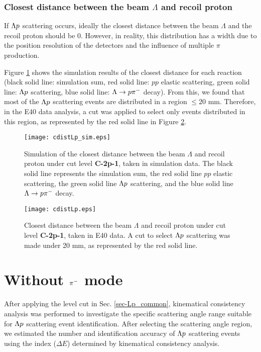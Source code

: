 \subsubsection{Closest distance between the beam $\Lambda$ and recoil proton}

If $\Lambda p$ scattering occurs, ideally the closest distance between the beam $\Lambda$ and the recoil proton should be 0. However, in reality, this distribution has a width due to the position resolution of the detectors and the influence of multiple $\pi$ production.

Figure \ref{fig-cdistLp_sim} shows the simulation results of the closest distance for each reaction (black solid line: simulation sum, red solid line: $pp$ elastic scattering, green solid line: $\Lambda p$ scattering, blue solid line: $\Lambda\to p\pi^{-}$ decay). From this, we found that most of the $\Lambda p$ scattering events are distributed in a region $\leq20$ mm. Therefore, in the E40 data analysis, a cut was applied to select only events distributed in this region, as represented by the red solid line in Figure \ref{fig-cdistLp}.

\begin{figure}[h]
  \centering
  \texttt{[image: cdistLp\_sim.eps]}
  \caption{Simulation of the closest distance between the beam $\Lambda$ and recoil proton under cut level {\bf C-2p-1}, taken in simulation data. The black solid line represents the simulation sum, the red solid line $pp$ elastic scattering, the green solid line $\Lambda p$ scattering, and the blue solid line $\Lambda\to p\pi^{-}$ decay.}
  \label{fig-cdistLp_sim}
\end{figure}

\begin{figure}[h]
  \centering
  \texttt{[image: cdistLp.eps]}
  \caption{Closest distance between the beam $\Lambda$ and recoil proton under cut level {\bf C-2p-1}, taken in E40 data. A cut to select $\Lambda p$ scattering was made under 20 mm, as represented by the red solid line.}
  \label{fig-cdistLp}
\end{figure}


\clearpage
\section{Without $\pi^{-}$ mode}
\label{sec-Lp_2p_woPi}

After applying the  level cut in Sec. \ref{sec-Lp_common}, kinematical consistency analysis was performed to investigate the specific scattering angle range suitable for $\Lambda p$ scattering event identification. %
After selecting the scattering angle region, we estimated the number and identification accuracy of $\Lambda p$ scattering events using the index ($\Delta E$) determined by kinematical consistency analysis.

